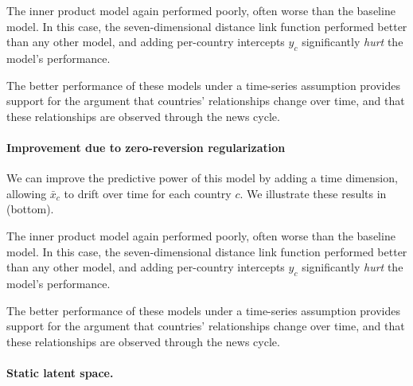 The inner product model again performed poorly, often worse than the
baseline model.  In this case, the seven-dimensional distance link
function performed better than any other model, and adding per-country
intercepts $y_c$ significantly \emph{hurt} the model's performance.

The better performance of these models under a time-series assumption
provides support for the argument that countries' relationships change
over time, and that these relationships are observed through the news
cycle.

\paragraph{Improvement due to zero-reversion regularization}
We can improve the predictive power of this model by adding a time
dimension, allowing $\bar x_c$ to drift over time for each country
$c$.  We illustrate these results in (bottom).

The inner product model again performed poorly, often worse than the
baseline model.  In this case, the seven-dimensional distance link
function performed better than any other model, and adding per-country
intercepts $y_c$ significantly \emph{hurt} the model's performance.

The better performance of these models under a time-series assumption
provides support for the argument that countries' relationships change
over time, and that these relationships are observed through the news
cycle.

\paragraph{Static latent space.}

